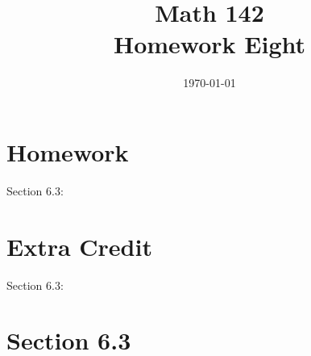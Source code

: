 \documentclass{exam}
\author{}
\date{\today}
\title{Math 142 \\ Homework Eight}
\begin{document}
  \maketitle

  \section{Homework}
  Section 6.3: 

  \section{Extra Credit}
  Section 6.3: 

  \ifprintanswers

    \section{Section 6.3}
\end{document}
